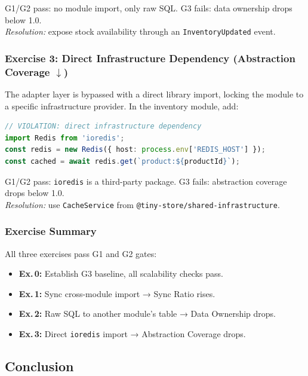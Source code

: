 \noindent
G1/G2 pass: no module import, only raw SQL. G3 fails: data ownership drops below 1.0.\\
\emph{Resolution:} expose stock availability through an \texttt{InventoryUpdated} event.\\

\subsubsection*{Exercise 3: Direct Infrastructure Dependency (Abstraction Coverage $\downarrow$)}
The adapter layer is bypassed with a direct library import, locking the module to a specific infrastructure provider. In the inventory module, add:

\begin{lstlisting}[basicstyle=\ttfamily\scriptsize,language=TypeScript,caption={Violation: direct infrastructure import},label={lst:g3-ex3-violation}]
// VIOLATION: direct infrastructure dependency
import Redis from 'ioredis';
const redis = new Redis({ host: process.env['REDIS_HOST'] });
const cached = await redis.get(`product:${productId}`);
\end{lstlisting}

\noindent
G1/G2 pass: \texttt{ioredis} is a third-party package. G3 fails: abstraction coverage drops below 1.0.\\
\emph{Resolution:} use \texttt{CacheService} from \texttt{@tiny-store/shared-infrastructure}.\\

\subsubsection*{Exercise Summary}
All three exercises pass G1 and G2 gates:
\begin{itemize}[itemsep=2pt,topsep=2pt]
  \item \textbf{Ex.\,0:} Establish G3 baseline, all scalability checks pass.
  \item \textbf{Ex.\,1:} Sync cross-module import → Sync Ratio rises.
  \item \textbf{Ex.\,2:} Raw SQL to another module's table → Data Ownership drops.
  \item \textbf{Ex.\,3:} Direct \texttt{ioredis} import → Abstraction Coverage drops.
\end{itemize}

\subsection*{Conclusion}

